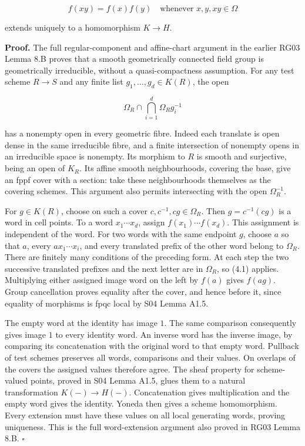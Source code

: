 \documentclass[11pt,a4paper,openany]{report}
\newcounter{none}
\begin{document}
\[
f(xy)=f(x)f(y)\quad\text{whenever }x,y,xy\in\Omega
\tag{4.1}
\]

extends uniquely to a homomorphism \(K\to H\).

\textbf{Proof.} The full regular-component and affine-chart argument in the earlier RG03 Lemma 8.B proves that a smooth geometrically connected field group is geometrically irreducible, without a quasi-compactness assumption. For any test scheme \(R\to S\) and any finite list \(g_1,\ldots,g_d\in K(R)\), the open

\[
\Omega_R\cap\bigcap_{i=1}^d\Omega_Rg_i^{-1}
\]

has a nonempty open in every geometric fibre. Indeed each translate is open dense in the same irreducible fibre, and a finite intersection of nonempty opens in an irreducible space is nonempty. Its morphism to \(R\) is smooth and surjective, being an open of \(K_R\). Its affine smooth neighbourhoods, covering the base, give an fppf cover with a section: take these neighbourhoods themselves as the covering schemes. This argument also permits intersecting with the open \(\Omega_R^{-1}\).

For \(g\in K(R)\), choose on such a cover \(c,c^{-1},cg\in\Omega_R\). Then \(g=c^{-1}(cg)\) is a word in cell points. To a word \(x_1\cdots x_d\), assign \(f(x_1)\cdots f(x_d)\). This assignment is independent of the word. For two words with the same endpoint \(g\), choose \(a\) so that \(a\), every \(ax_1\cdots x_i\), and every translated prefix of the other word belong to \(\Omega_R\). There are finitely many conditions of the preceding form. At each step the two successive translated prefixes and the next letter are in \(\Omega_R\), so (4.1) applies. Multiplying either assigned image word on the left by \(f(a)\) gives \(f(ag)\). Group cancellation proves equality after the cover, and hence before it, since equality of morphisms is fpqc local by S04 Lemma A1.5.

The empty word at the identity has image \(1\). The same comparison consequently gives image \(1\) to every identity word. An inverse word has the inverse image, by comparing its concatenation with the original word to that empty word. Pullback of test schemes preserves all words, comparisons and their values. On overlaps of the covers the assigned values therefore agree. The sheaf property for scheme-valued points, proved in S04 Lemma A1.5, glues them to a natural transformation \(K(-)\to H(-)\). Concatenation gives multiplication and the empty word gives the identity. Yoneda then gives a scheme homomorphism. Every extension must have these values on all local generating words, proving uniqueness. This is the full word-extension argument also proved in RG03 Lemma 8.B. \(\square\)
\end{document}

